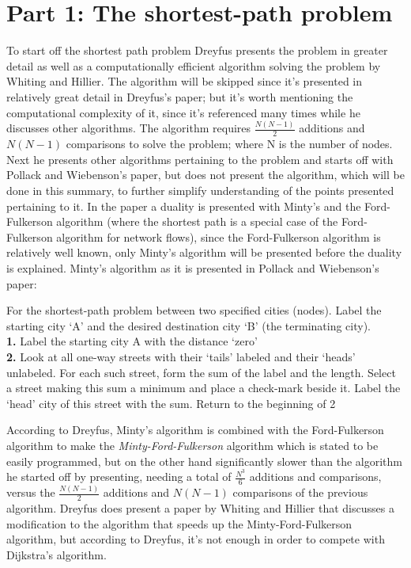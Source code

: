 \documentclass{article}
\begin{document}
\section*{Part 1: The shortest-path problem}
To start off the shortest path problem Dreyfus presents the problem in greater detail
as well as a computationally efficient algorithm solving the problem by Whiting and Hillier.
The algorithm will be skipped since it's presented in relatively great detail in Dreyfus's paper;
but it's worth mentioning the computational complexity of it, since it's referenced many times
while he discusses other algorithms. The algorithm requires $\frac{N(N-1)}{2}$ additions and $N(N-1)$ 
comparisons to solve the problem; where N is the number of nodes. Next he presents other
algorithms pertaining to the problem and starts off with Pollack and Wiebenson's paper\cite{pollack_wibenson}, but does not present the algorithm, which will be done in this summary, to 
further simplify understanding of the points presented pertaining to it. In the paper a duality 
is presented with Minty's and the Ford-Fulkerson algorithm (where the shortest path is a special case of
the Ford-Fulkerson algorithm for network flows), since the Ford-Fulkerson algorithm is relatively well
known, only Minty's algorithm will be presented before the duality is explained. Minty's algorithm 
as it is presented in Pollack and Wiebenson's paper: 
\vspace{2mm}

\noindent For the shortest-path problem between two specified cities (nodes).
Label the starting city `A' and the desired destination city `B' (the terminating city). \\
\indent \textbf{1.} Label the starting city A with the distance `zero' \\
\indent \textbf{2.} Look at all one-way streets with their `tails' labeled
and their `heads' unlabeled. For each such street, form the sum of the label and the length. Select a
street making this sum a minimum and place a check-mark beside it. Label the
`head' city of this street with the sum. Return to the beginning of 2 

\vspace{2mm}

\noindent According to Dreyfus, Minty's algorithm is combined with the Ford-Fulkerson
algorithm to make the \textit{Minty-Ford-Fulkerson} algorithm which is stated to be
easily programmed, but on the other hand significantly slower than the algorithm he
started off by presenting, needing a total of $\frac{N^{3}}{6}$ additions and comparisons, versus
the $\frac{N(N-1)}{2}$ additions and $N(N-1)$ comparisons of the previous algorithm. Dreyfus does
present a paper by Whiting and Hillier that discusses a modification to the algorithm
that speeds up the Minty-Ford-Fulkerson algorithm, but according to Dreyfus, it's not
enough in order to compete with Dijkstra's algorithm.
\end{document}
